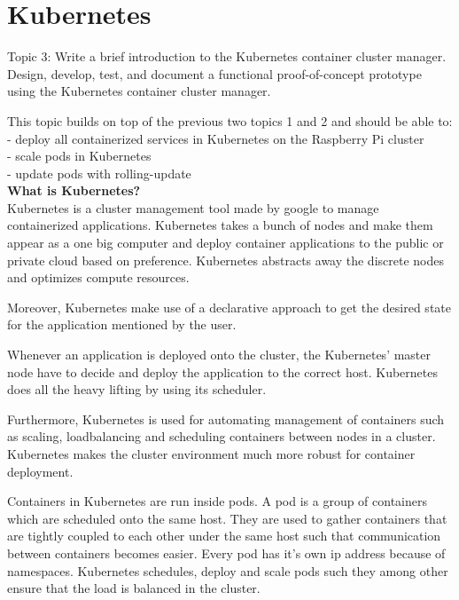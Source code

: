 \chapter{Kubernetes}\label{ch:kubernetes}
Topic 3: Write a brief introduction to the Kubernetes container cluster manager. 
Design, develop, test, and document a functional proof-of-concept prototype using the Kubernetes container cluster manager. 

This topic builds on top of the previous two topics 1 and 2 and should be able to:\\
- deploy all containerized services in Kubernetes on the Raspberry Pi cluster \\
- scale pods in Kubernetes \\
- update pods with rolling-update \\

\textbf{What is Kubernetes?}\\
Kubernetes is a cluster management tool made by google to manage containerized applications. Kubernetes takes a bunch of nodes and make them appear as a one big computer and deploy container applications to the public or private cloud based on preference. Kubernetes abstracts away the discrete nodes and optimizes compute resources.  

Moreover, Kubernetes make use of a declarative approach to get the desired state for the application mentioned by the user. 

Whenever an application is deployed onto the cluster, the Kubernetes' master node have to decide and deploy the application to the correct host. Kubernetes does all the heavy lifting by using its scheduler. 

Furthermore, Kubernetes is used for automating management of containers such as scaling, loadbalancing and scheduling containers between nodes in a cluster. Kubernetes makes the cluster environment much more robust for container deployment.

Containers in Kubernetes are run inside pods. A pod is a group of containers which are scheduled onto the same host. They are used to gather containers that are tightly coupled to each other under the same host such that communication between containers becomes easier. Every pod has it's own ip address because of namespaces. Kubernetes schedules, deploy and scale pods such they among other ensure that the load is balanced in the cluster. 

